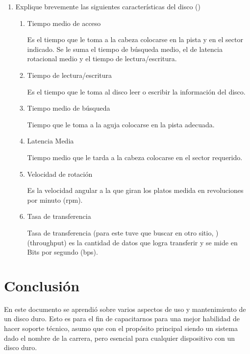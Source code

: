 \documentclass[stu, 12pt, letterpaper, donotrepeattitle, floatsintext, natbib, helv]{apa7}
\begin{document}
\begin{enumerate}
    \item Explique brevemente las siguientes características del disco (\cite{DiscosDuros})
    \begin{enumerate}
        \item Tiempo medio de acceso
        
        Es el tiempo que le toma a la cabeza colocarse en la pista y en el sector indicado. Se le suma el tiempo de búsqueda medio, el de latencia rotacional medio y el tiempo de lectura/escritura.
        
        \item Tiempo de lectura/escritura
        
        Es el tiempo que le toma al disco leer o escribir la información del disco.
        
        \item Tiempo medio de búsqueda
        
        Tiempo que le toma a la aguja colocarse en la pista adecuada.

        \item Latencia Media
        
        Tiempo medio que le tarda a la cabeza colocarse en el sector requerido.
        
        \item Velocidad de rotación
        
        Es la velocidad angular a la que giran los platos medida en revoluciones por minuto (rpm).
        
        \item Tasa de transferencia
         
        Tasa de transferencia (para este tuve que buscar en otro sitio, \cite{TasaDeTransferencia})(throughput) es la cantidad de datos que logra transferir y se mide en Bits por segundo (bps).
    \end{enumerate}
\end{enumerate}

\section*{Conclusión}
{}
En este documento se aprendió sobre varios aspectos de uso y mantenimiento de un disco duro. Esto es para el fin de capacitarnos para una mejor habilidad de hacer soporte técnico, asumo que con el propósito principal siendo un sistema dado el nombre de la carrera, pero esencial para cualquier dispositivo con un disco duro.

\newpage
\renewcommand\refname{\large\textbf{Referencias}}

\end{document}
